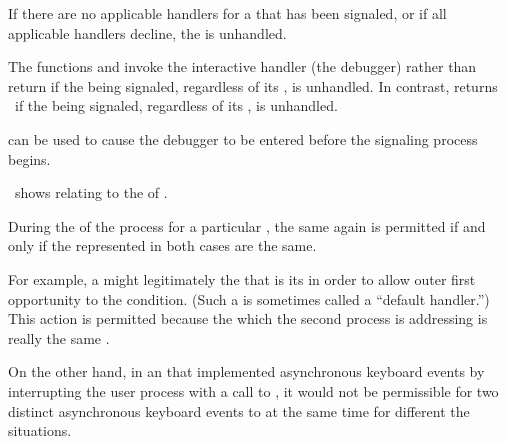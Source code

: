 If there are no applicable handlers for a  that
has been signaled, or if all applicable handlers decline, the
 is unhandled.
 
The functions  and  invoke the
interactive  handler (the debugger) rather than
return if the  being signaled, regardless of
its , is unhandled.  In contrast, 
returns \nil\ if the  being signaled,
regardless of its , is unhandled.

 can be used to cause the
debugger to be entered before the signaling process begins.
 
\Thenextfigure\ shows  relating to
the  of .



During the  of the  process for
a particular  , 
 the same   again
is permitted if and only if the  represented in both
cases are the same.

For example, a  might legitimately  
the   that is its 
in order to allow outer  first opportunity to  
the condition.  (Such a  is sometimes called a ``default handler.'')
This action is permitted because the  which the second
 process is addressing is really the same .

On the other hand, in an  that implemented asynchronous 
keyboard events by interrupting the user process with a call to ,
it would not be permissible for two distinct asynchronous keyboard events
to    
at the same time for different the situations.
 
\endsubsubsubsection%

\endsubsubsection%
 
